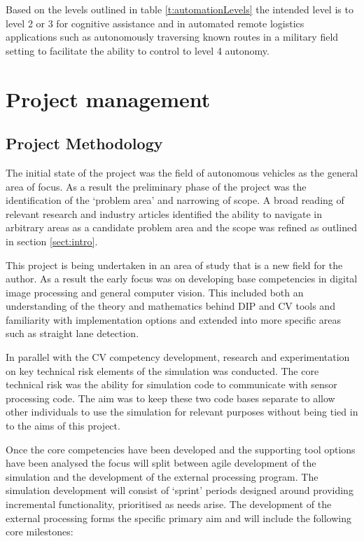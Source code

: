 \documentclass[]{aiaa-tc}%
\begin{document}
Based on the levels outlined in table \ref{t:automationLevels} the intended level is to level 2 or 3 for cognitive assistance and in automated remote logistics applications such as autonomously traversing known routes in a military field setting to facilitate the ability to control to level 4 autonomy.

\section{Project management}

\subsection{Project Methodology}

The initial state of the project was the field of autonomous vehicles as the general area of focus. As a result the preliminary phase of the project was the identification of the `problem area' and narrowing of scope. A broad reading of relevant research and industry articles identified the ability to navigate in arbitrary areas as a candidate problem area and the scope was refined as outlined in section \ref{sect:intro}. 

This project is being undertaken in an area of study that is a new field for the author. As a result the early focus was on developing base competencies in digital image processing and general computer vision. This included both an understanding of the theory and mathematics behind DIP and CV tools and familiarity with implementation options and extended into more specific areas such as straight lane detection.

In parallel with the CV competency development, research and experimentation on key technical risk elements of the simulation was conducted. The core technical risk was the ability for simulation code to communicate with sensor processing code. The aim was to keep these two code bases separate to allow other individuals to use the simulation for relevant purposes without being tied in to the aims of this project.

Once the core competencies have been developed and the supporting tool options have been analysed the focus will split between agile development of the simulation and the development of the external processing program. The simulation development will consist of `sprint' periods designed around providing incremental functionality, prioritised as needs arise. The development of the external processing forms the specific primary aim and will include the following core milestones:
\end{document}
